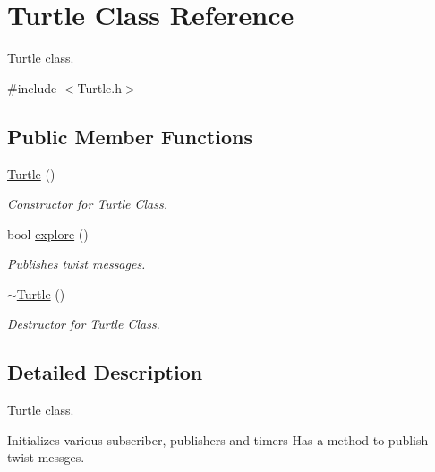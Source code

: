 \hypertarget{classTurtle}{}\section{Turtle Class Reference}
\label{classTurtle}


\hyperlink{classTurtle}{Turtle} class.  




{\ttfamily \#include $<$Turtle.\+h$>$}

\subsection*{Public Member Functions}
\begin{DoxyCompactItemize}
\item 
\hyperlink{classTurtle_a1610c37c2e750169f25b074e62db755d}{Turtle} ()\hypertarget{classTurtle_a1610c37c2e750169f25b074e62db755d}{}\label{classTurtle_a1610c37c2e750169f25b074e62db755d}

\begin{DoxyCompactList}\small\item\em Constructor for \hyperlink{classTurtle}{Turtle} Class. \end{DoxyCompactList}\item 
bool \hyperlink{classTurtle_a04d9260bad936b1a187eaaa49a396e56}{explore} ()
\begin{DoxyCompactList}\small\item\em Publishes twist messages. \end{DoxyCompactList}\item 
\hyperlink{classTurtle_a96c3c4ddca2b6715b6939a6a5d8a7ecb}{$\sim$\+Turtle} ()\hypertarget{classTurtle_a96c3c4ddca2b6715b6939a6a5d8a7ecb}{}\label{classTurtle_a96c3c4ddca2b6715b6939a6a5d8a7ecb}

\begin{DoxyCompactList}\small\item\em Destructor for \hyperlink{classTurtle}{Turtle} Class. \end{DoxyCompactList}\end{DoxyCompactItemize}


\subsection{Detailed Description}
\hyperlink{classTurtle}{Turtle} class. 

Initializes various subscriber, publishers and timers Has a method to publish twist messges. 


